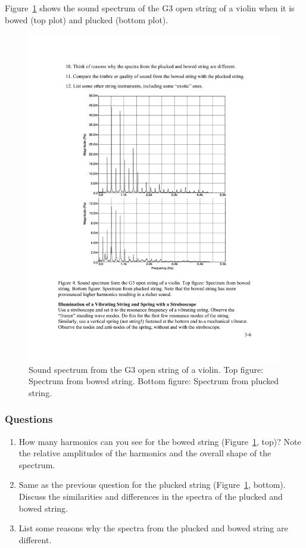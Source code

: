 \documentclass[11pt]{NSF}
\def\ben{\begin{enumerate}}
\def\een{\end{enumerate}}
\def\i{\item{}}
\begin{document}
Figure~\ref{f:4} shows the sound  spectrum of the G3 open string of a violin
when it is bowed (top plot) and plucked (bottom plot).
%
\begin{figure}[hbtp] 
\begin{center} 
\includegraphics[width=.7\textwidth]{fig3_4}
\caption{Sound spectrum from the G3 open string of a violin. 
Top figure: Spectrum from bowed string. 
Bottom figure: Spectrum from plucked string.}
\label{f:4} 
\end{center} 
\end{figure}
%

\subsubsection*{Questions}
\ben

\i How many harmonics can you see for the bowed string (Figure~\ref{f:4}, top)? 
Note the relative amplitudes of the harmonics and the 
overall shape of the spectrum.

\i Same as the previous question for the plucked string (Figure~\ref{f:4}, bottom).
Discuss the similarities and differences in the spectra of the plucked and bowed string. 

\i List some reasons why the spectra from the plucked and bowed string are different.

\een
\end{document}
